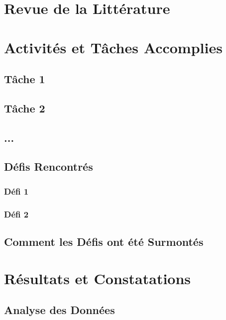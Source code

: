 \documentclass[12pt,a4paper]{report}
\begin{document}
\chapter{Revue de la Littérature}

\chapter{Activités et Tâches Accomplies}
\section{Tâche 1}

\section{Tâche 2}

\section{...}

\section{Défis Rencontrés}
\subsection{Défi 1}

\subsection{Défi 2}

\section{Comment les Défis ont été Surmontés}

\chapter{Résultats et Constatations}
\section{Analyse des Données}
\end{document}
